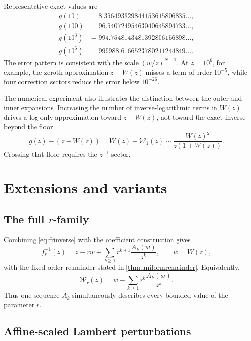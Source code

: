 \documentclass[11pt]{article}
\theoremstyle{clean}
\newcommand{\rLambert}{\mathcal W}
\begin{document}
Representative exact values are
\begin{align*}
 g(10)&=8.366493829844153615806835\ldots,\\
 g(100)&=96.64072495463040645894733\ldots,\\
 g(10^3)&=994.7548143481392806156898\ldots,\\
 g(10^6)&=999988.6166523780211244849\ldots.
\end{align*}
The error pattern is consistent with the scale
\((w/z)^{N+1}\).  At \(z=10^6\), for example, the zeroth approximation
\(z-W(z)\) misses a term of order \(10^{-5}\), while four correction sectors
reduce the error below \(10^{-26}\).

The numerical experiment also illustrates the distinction between the outer
and inner expansions.  Increasing the number of inverse-logarithmic terms in
\(W(z)\) drives a log-only approximation toward \(z-W(z)\), not toward the
exact inverse beyond the floor
\[
  g(z)-(z-W(z))=W(z)-\rLambert_1(z)
  \sim\frac{W(z)^2}{z(1+W(z))}.
\]
Crossing that floor requires the \(z^{-1}\) sector.

\section{Extensions and variants}

\subsection{The full \texorpdfstring{\(r\)}{r}-family}

Combining \cref{eq:frinverse} with the coefficient construction gives
\begin{equation}\label{eq:rfull}
  f_r^{-1}(z)=z-rw+
  \sum_{k\ge1}r^{k+1}\frac{A_k(w)}{z^k},
  \qquad w=W(z),
\end{equation}
with the fixed-order remainder stated in \cref{thm:uniformremainder}.  Equivalently,
\begin{equation}\label{eq:rLambertExpansion}
  \rLambert_r(z)=w-
  \sum_{k\ge1}r^k\frac{A_k(w)}{z^k}.
\end{equation}
Thus one sequence \(A_k\) simultaneously describes every bounded value of the
parameter \(r\).

\subsection{Affine-scaled Lambert perturbations}
\end{document}
